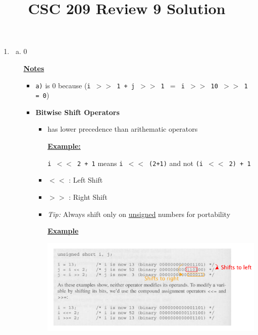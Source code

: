 \documentclass[12pt]{article}
\begin{document}
\title{CSC 209 Review 9 Solution}
\maketitle

\bigskip

\begin{enumerate}[1.]
    \item

    \begin{enumerate}[a)]
        \item 0

        \bigskip

        \underline{\textbf{Notes}}

        \begin{itemize}
            \item \texttt{a)} is 0 because  (\texttt{i $>>$ 1 + j $>>$ 1 $=$ i $>>$ 10 $>>$ 1 = 0})
            \item
            \textbf{Bitwise Shift Operators}

            \begin{itemize}
                \item has lower precedence than arithematic operators

                \bigskip

                \underline{\textbf{Example:}}

                \bigskip

                \texttt{i $<<$ 2 + 1} means \texttt{i $<<$ (2+1)} and not \texttt{(i $<<$ 2) + 1}

                \bigskip


                \item $<<$ : Left Shift
                \item $>>$ : Right Shift
                \item \textit{Tip:} Always shift only on \underline{unsigned} numbers for portability


                \bigskip

                \underline{\textbf{Example}}

                \bigskip

                \begin{center}
                \includegraphics[width=0.9\linewidth]{images/review_9_solution_1.png}
                \end{center}


\end{itemize}
\end{itemize}
\end{enumerate}
\end{enumerate}
\end{document}
